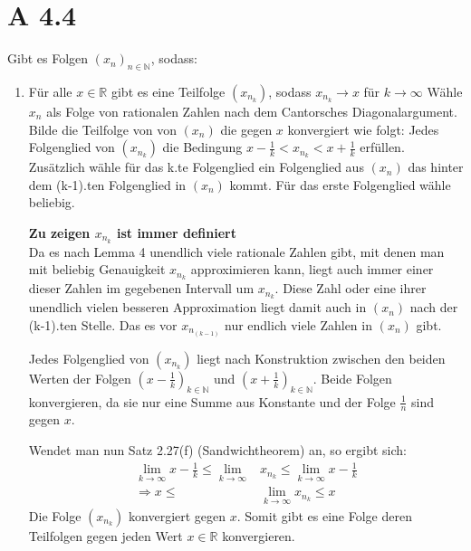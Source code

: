 \documentclass[11pt]{article}
\begin{document}
    \section*{A 4.4}
        Gibt es Folgen \( {(x_n)}_{n \in \mathbb{N}} \), sodass:
        \begin{enumerate}[ label = (\roman*)]
            \item Für alle \( x \in \mathbb{R} \) gibt es eine Teilfolge \( (x_{n_k}) \), sodass \(x_{n_k} \to x\) für \( k \to \infty \)
            Wähle \(x_n\) als Folge von rationalen Zahlen nach dem Cantorsches Diagonalargument.
            Bilde die Teilfolge von von \((x_n)\) die gegen \(x\) konvergiert wie folgt:
            Jedes Folgenglied von \( (x_{n_k}) \) die Bedingung \( x - \frac{1}{k} < x_{n_k} < x + \frac{1}{k} \) erfüllen.
            Zusätzlich wähle für das k.te Folgenglied ein Folgenglied aus \((x_n)\) das hinter dem (k-1).ten Folgenglied in \((x_n)\) kommt.
            Für das erste Folgenglied wähle beliebig.

            \textbf{Zu zeigen \(x_{n_k}\) ist immer definiert} \\
            Da es nach Lemma 4 unendlich viele rationale Zahlen gibt, mit denen man mit beliebig Genauigkeit \( x_{n_k} \) approximieren kann,
            liegt auch immer einer dieser Zahlen im gegebenen Intervall um \( x_{n_k} \). Diese Zahl oder eine ihrer unendlich vielen
            besseren Approximation liegt damit auch in \( (x_n) \) nach der (k-1).ten Stelle. Das es vor \(x_{n_{(k-1)}}\) nur endlich viele Zahlen in \( (x_n) \) gibt.

            Jedes Folgenglied von \((x_{n_k})\) liegt nach Konstruktion zwischen den beiden Werten der Folgen
            \( {(x - \frac{1}{k}) }_{k \in \mathbb{N}}\) und \( { (x + \frac{1}{k}) }_{k \in \mathbb{N}} \).
            Beide Folgen konvergieren, da sie nur eine Summe aus Konstante und der Folge \(\frac{1}{n}\) sind gegen \(x\).

            Wendet man nun Satz 2.27(f) (Sandwichtheorem) an, so ergibt sich:
            \begin{align*}
                \lim_{k \to \infty} x - \frac{1}{k} \leq \lim_{k \to \infty} &x_{n_k} \leq \lim_{k \to \infty} x - \frac{1}{k} \\
                \Rightarrow x \leq &\lim_{k \to \infty} x_{n_k} \leq x
            \end{align*}
            Die Folge \((x_{n_k})\) konvergiert gegen \(x\).
            Somit gibt es eine Folge deren Teilfolgen gegen jeden Wert \( x \in \mathbb{R} \) konvergieren.
            

\end{enumerate}
\end{document}
